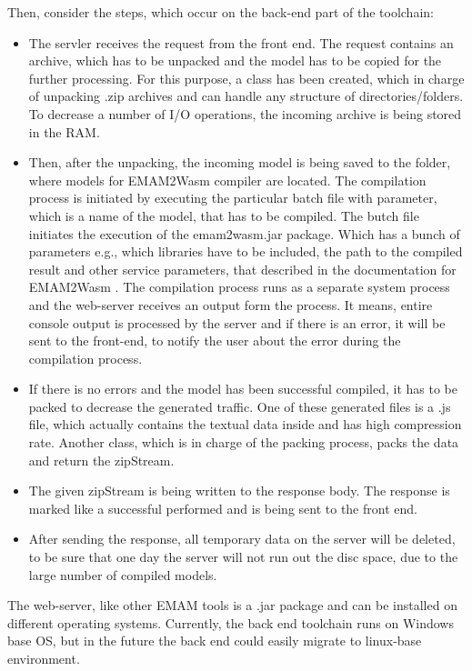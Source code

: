 Then, consider the steps, which occur on the back-end part of the toolchain:
\begin{itemize}
    \item The servler receives the request from the front end. The request contains an archive, which has to be unpacked and the model has to be copied for the further processing. For this purpose, a class has been created, which in charge of unpacking .zip archives and can handle any structure of directories/folders. To decrease a number of I/O operations, the incoming archive is being stored in the RAM.
    \item Then, after the unpacking, the incoming model is being saved to the folder, where models for EMAM2Wasm compiler are located. The compilation process is initiated by executing the particular batch file with parameter, which is a name of the model, that has to be compiled. The butch file initiates the execution of the emam2wasm.jar package. Which has a bunch of parameters e.g., which libraries have to be included, the path to the compiled result and other service parameters, that described in the documentation for EMAM2Wasm \cite{EMAM2Wasm}. The compilation process runs as a separate system process and the web-server receives an output form the process. It means, entire console output is processed by the server and if there is an error, it will be sent to the front-end, to notify the user about the error during the compilation process.
    \item If there is no errors and the model has been successful compiled, it has to be packed to decrease the generated traffic. One of these generated files is a .js file, which actually contains the textual data inside and has high compression rate. Another class, which is in charge of the packing process, packs the data and return the zipStream.
    \item The given zipStream is being written to the response body. The response is marked like a successful performed and is being sent to the front end.
    \item After sending the response, all temporary data on the server will be deleted, to be sure that one day the server will not run out the disc space, due to the large number of compiled models.
\end{itemize}
The web-server, like other EMAM tools is a .jar package and can be installed on different operating systems. Currently, the back end toolchain runs on Windows base OS, but in the future the back end could easily migrate to linux-base environment.
